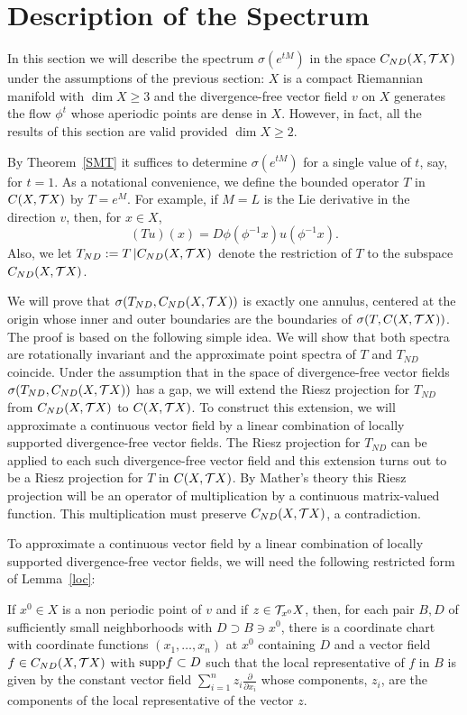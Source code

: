 \section{Description of the Spectrum}
In this section we will describe the spectrum $\sigma(e^{tM})$ in
the space $C_{ND}(X,{{\cal{T}}X})$ under the assumptions of the previous
section:
$X$ is a compact  Riemannian manifold
with $\dim X\ge 3$  and the divergence-free
vector field $v$ on $X$ generates
the flow $\phi^t$ whose aperiodic points  are
dense in $X$. However, in fact,
all the results of this section are valid provided $\dim X\ge 2$.

By Theorem~\ref{SMT} it suffices to determine $\sigma(e^{tM})$ for
a single value of $t$, say, for $t=1$.
As a notational convenience, we
define the bounded operator $T$ in $C(X,{{\cal{T}}X})$ by
$T=e^M$.  For example, if $M=L$ is the Lie derivative in the
direction $v$, then, for $x\in X$,
\[ (Tu)(x)=D\phi(\phi^{-1}x)u(\phi^{-1}x).\]
Also, we let $T_{ND}:=T \left| C_{ND}(X,{{\cal{T}}X})\right.$ denote the
restriction of $T$ to the subspace $C_{ND}(X,{{\cal{T}}X})$.

We will prove that $\sigma(T_{ND},{C_{ND}(X,{{\cal{T}}X})})$ is exactly one annulus,
centered at the origin whose inner and outer boundaries
are the boundaries of $\sigma(T,{C(X,{{\cal{T}}X})})$.
The proof is based on the
following simple idea.  We will show that
both spectra are rotationally invariant and the
approximate point spectra
of $T$ and $T_{ND}$ coincide. Under the assumption that in the space of
divergence-free vector fields
$\sigma(T_{ND},{C_{ND}(X,{{\cal{T}}X})})$ has a gap, we will extend the Riesz
projection for $T_{ND}$ from ${C_{ND}(X,{{\cal{T}}X})}$ to ${C(X,{{\cal{T}}X})}$. To construct this
extension, we will approximate a continuous vector field by a
linear combination of locally supported divergence-free vector
fields. The Riesz projection for $T_{ND}$ can
be applied to each such divergence-free vector field and
this extension turns out to be a Riesz
projection for $T$ in ${C(X,{{\cal{T}}X})}$. By Mather's theory this Riesz projection
will be an operator of multiplication by a
continuous matrix-valued function.
This multiplication must preserve ${C_{ND}(X,{{\cal{T}}X})}$, a
contradiction.

To approximate a continuous vector field by a
linear combination of locally supported divergence-free vector
fields, we will need the following restricted
form of Lemma~\ref{loc}:
\begin{lem}\label{loc2}
If  $x^0\in X$ is a non periodic point of $v$ and if
$z \in {\cal T}_{x^{0}}X$, then, for each
pair $B,D$ of
sufficiently small neighborhoods with
$D\supset B \ni x^0$,  there is a coordinate chart  with
coordinate functions $(x_1,\ldots,x_n)$ at
$x^0$ containing $D$ and a
vector field $f\in C_{ND}(X,{{\cal{T}}X})$ with
$\hbox{\rm supp} f\subset D$ such that the local representative of $f$
in $B$ is given by the constant vector field
$\displaystyle{\sum_{i=1}^nz_i\frac{\partial}{\partial x_i}}$
whose components, $z_i$,  are the components of the local
representative of the vector $z$.
\end{lem}

